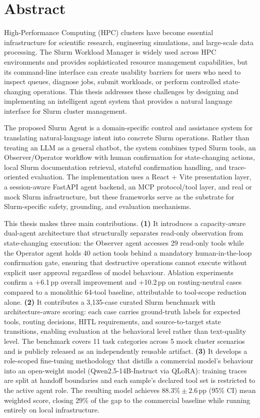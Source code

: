 \chapter*{Abstract}

High-Performance Computing (HPC) clusters have become essential infrastructure for scientific research, engineering simulations, and large-scale data processing. The Slurm Workload Manager is widely used across HPC environments and provides sophisticated resource management capabilities, but its command-line interface can create usability barriers for users who need to inspect queues, diagnose jobs, submit workloads, or perform controlled state-changing operations. This thesis addresses these challenges by designing and implementing an intelligent agent system that provides a natural language interface for Slurm cluster management.

The proposed Slurm Agent is a domain-specific control and assistance system for translating natural-language intent into concrete Slurm operations. Rather than treating an LLM as a general chatbot, the system combines typed Slurm tools, an Observer/Operator workflow with human confirmation for state-changing actions, local Slurm documentation retrieval, stateful confirmation handling, and trace-oriented evaluation. The implementation uses a React + Vite presentation layer, a session-aware FastAPI agent backend, an MCP protocol/tool layer, and real or mock Slurm infrastructure, but these frameworks serve as the substrate for Slurm-specific safety, grounding, and evaluation mechanisms.

This thesis makes three main contributions. \textbf{(1)} It introduces a capacity-aware dual-agent architecture that structurally separates read-only observation from state-changing execution: the Observer agent accesses 29 read-only tools while the Operator agent holds 40 action tools behind a mandatory human-in-the-loop confirmation gate, ensuring that destructive operations cannot execute without explicit user approval regardless of model behaviour. Ablation experiments confirm a +6.1\,pp overall improvement and +10.2\,pp on routing-neutral cases compared to a monolithic 64-tool baseline, attributable to tool-scope reduction alone. \textbf{(2)} It contributes a 3,135-case curated Slurm benchmark with architecture-aware scoring: each case carries ground-truth labels for expected tools, routing decisions, HITL requirements, and source-to-target state transitions, enabling evaluation at the behavioral level rather than text-quality level. The benchmark covers 11 task categories across 5 mock cluster scenarios and is publicly released as an independently reusable artifact. \textbf{(3)} It develops a role-scoped fine-tuning methodology that distills a commercial model's behaviour into an open-weight model (Qwen2.5-14B-Instruct via QLoRA): training traces are split at handoff boundaries and each sample's declared tool set is restricted to the active agent role. The resulting model achieves $88.3\% \pm 2.6$\,pp (95\% CI) mean weighted score, closing 29\% of the gap to the commercial baseline while running entirely on local infrastructure.

